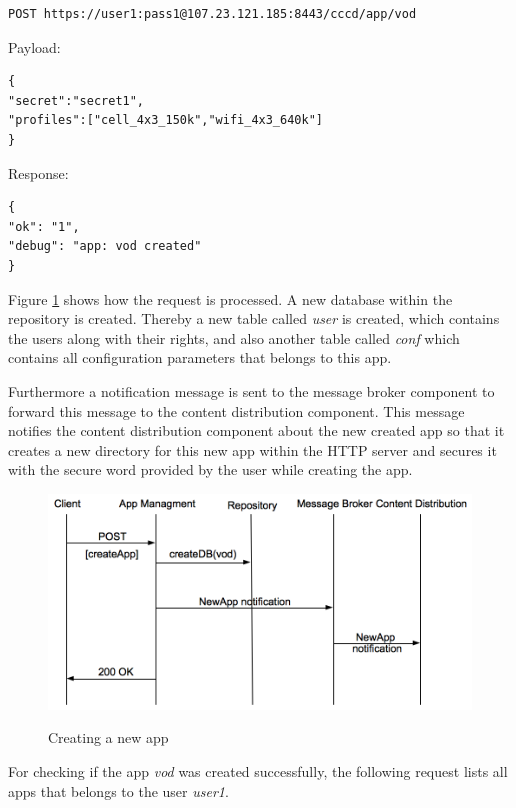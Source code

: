 \begin{code}
\begin{verbatim}
POST https://user1:pass1@107.23.121.185:8443/cccd/app/vod
\end{verbatim}
Payload:
\begin{verbatim}
{
"secret":"secret1",
"profiles":["cell_4x3_150k","wifi_4x3_640k"]
}
\end{verbatim}
Response:
\begin{verbatim}
{
"ok": "1",
"debug": "app: vod created"
}
\end{verbatim}
\end{code}
 
Figure \ref{fig:newApp} shows how the request is processed. A new database within the repository is created. Thereby a new table called \textit{user} is created, which contains the users along with their rights, and also another table called \textit{conf} which contains all configuration parameters that belongs to this app.

Furthermore a notification message is sent to the message broker component to forward this message to the content distribution component. This message notifies the content distribution component about the new created app so that it creates a new directory for this new app within the HTTP server and secures it with the secure word provided by the user while creating the app.

\begin{figure}[htb]
  \centering
  \includegraphics[scale=0.6]{flows/newAppFlow.png}\\
  \caption{Creating a new app}
  \label{fig:newApp}
\end{figure}

For checking if the app \textit{vod} was created successfully, the following request lists all apps that belongs to the user \textit{user1}.

